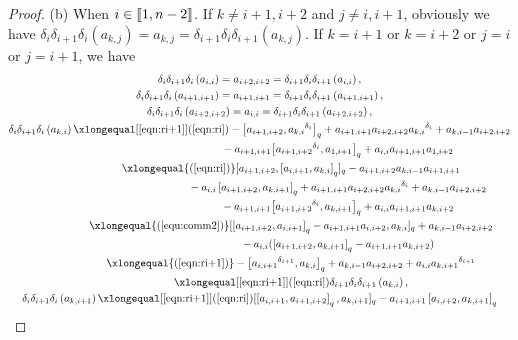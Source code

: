 \documentclass[pdftex]{sigma}
\numberwithin{equation}{section}
\def\lr#1{\left[#1\right]}
\def\lrb#1{\left(#1\right)}
\def\d{\delta}
\def\lbb#1{\left[\kern-0.15em\left[ {#1} \right] \kern-0.15em\right]}
\begin{document}
\begin{proof}
(b) When $i \in \lbb{1,n-2}$.
If $k \neq i+1, i+2$ and $j\neq i, i+1$, obviously we have
$\d_i\d_{i+1}\d_i\lrb{a_{k,j}}=a_{k,j}=\d_{i+1}\d_i\d_{i+1}\lrb{a_{k,j}}$.
If $k=i+1$ or $k=i+2$ or $j=i$ or $j=i+1$, we have
\begin{gather*}
 \d_i\d_{i+1}\d_i\lrb{a_{i,i}}
=a_{i+2,i+2}
=\d_{i+1}\d_i\d_{i+1}\lrb{a_{i,i}},\\
 \d_i\d_{i+1}\d_i\lrb{a_{i+1,i+1}}
=a_{i+1,i+1}
=\d_{i+1}\d_i\d_{i+1}\lrb{a_{i+1,i+1}},\\
 \d_i\d_{i+1}\d_i\lrb{a_{i+2,i+2}}
=a_{i,i}
=\d_{i+1}\d_i\d_{i+1}\lrb{a_{i+2,i+2}},\\
 \d_i\d_{i+1}\d_i\lrb{a_{k,i}}
 \xlongequal[\eqref{eqn:ri+1}]{\lrb{\ref{eqn:ri}}} -\bigl[a_{i+1,i+2}, {a_{k,i}}^{\d_{i}}\bigr]_q+a_{i+1,i+1}a_{i+2,i+2} {a_{k,i}}^{\d_{i}}+a_{k,i-1}a_{i+2,i+2}\\
\phantom{ \d_i\d_{i+1}\d_i\lrb{a_{k,i}}\xlongequal{\qquad}\!\! }{} -a_{i+1,i+1}\bigl[ {a_{i+1,i+2}}^{\d_{i}}, a_{1,i+1}\bigr]_q+a_{i,i}a_{i+1,i+1}a_{1,i+2}\\
 \phantom{ \d_i\d_{i+1}\d_i\lrb{a_{k,i}} }{} \xlongequal{\lrb{\ref{eqn:ri}}} [a_{i+1,i+2},\lr{a_{i,i+1}, a_{k,i}}_q]_q -a_{i+1,i+2}a_{k,i-1}a_{i+1,i+1}\\
 \phantom{ \d_i\d_{i+1}\d_i\lrb{a_{k,i}}\xlongequal{\qquad}\!\! }{} -a_{i,i}\lr{a_{i+1,i+2}, a_{k,i+1}}_q +a_{i+1,i+1}a_{i+2,i+2} {a_{k,i}}^{\d_{i}} +a_{k,i-1}a_{i+2,i+2}\\
 \phantom{ \d_i\d_{i+1}\d_i\lrb{a_{k,i}}\xlongequal{\qquad}\!\! }{} -a_{i+1,i+1}\bigl[{a_{i+1,i+2}}^{\d_{i}}, a_{k,i+1}\bigr]_q +a_{i,i}a_{i+1,i+1}a_{k,i+2}\\
 \phantom{ \d_i\d_{i+1}\d_i\lrb{a_{k,i}} }{} \xlongequal{\lrb{\ref{equ:comm2}}} [\lr{a_{i+1,i+2}, a_{i,i+1}}_q -a_{i+1,i+1}a_{i,i+2}, a_{k,i}]_q+a_{k,i-1}a_{i+2,i+2}\\
 \phantom{ \d_i\d_{i+1}\d_i\lrb{a_{k,i}}\xlongequal{\qquad}\!\! }{} -a_{i,i}(\lr{a_{i+1,i+2}, a_{k,i+1}}_q-a_{i+1,i+1}a_{k,i+2})\\
 \phantom{ \d_i\d_{i+1}\d_i\lrb{a_{k,i}} }{} \xlongequal{\lrb{\ref{eqn:ri+1}}} -\bigl[{a_{i,i+1}}^{\d_{i+1}}, a_{k,i}\bigr]_q+a_{k,i-1}a_{i+2,i+2} +a_{i,i}{a_{k,i+1}}^{\d_{i+1}}\\
 \phantom{ \d_i\d_{i+1}\d_i\lrb{a_{k,i}} }{} \xlongequal[\eqref{eqn:ri+1}]{\lrb{\ref{eqn:ri}}} \d_{i+1}\d_i\d_{i+1}\lrb{a_{k,i}}, \\ \d_i\d_{i+1}\d_i\lrb{a_{k,i+1}}
 \xlongequal[\eqref{eqn:ri+1}]{\lrb{\ref{eqn:ri}}} [\lr{a_{i,i+1}, a_{i+1,i+2}}_q, a_{k,i+1}]_q -a_{i+1,i+1}\lr{a_{i,i+2}, a_{k,i+1}}_q \\

\end{gather*}
\end{proof}
\end{document}
